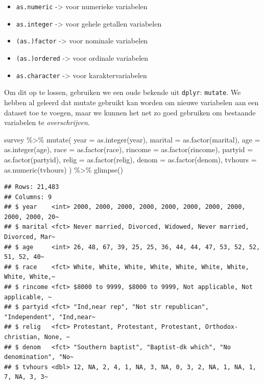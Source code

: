 \documentclass[]{tufte-book}
\newenvironment{Shaded}{}{}
\newcommand{\AttributeTok}[1]{\textcolor[rgb]{0.49,0.56,0.16}{#1}}
\newcommand{\FunctionTok}[1]{\textcolor[rgb]{0.02,0.16,0.49}{#1}}
\newcommand{\NormalTok}[1]{#1}
\newcommand{\SpecialCharTok}[1]{\textcolor[rgb]{0.25,0.44,0.63}{#1}}
\providecommand{\tightlist}{%
  \setlength{\itemsep}{0pt}\setlength{\parskip}{0pt}}
\begin{document}
\begin{itemize}
\tightlist
\item
  \texttt{as.numeric} -\textgreater{} voor numerieke variabelen
\item
  \texttt{as.integer} -\textgreater{} voor gehele getallen variabelen
\item
  \texttt{(as.)factor} -\textgreater{} voor nominale variabelen
\item
  \texttt{(as.)ordered} -\textgreater{} voor ordinale variabelen
\item
  \texttt{as.character} -\textgreater{} voor karaktervariabelen
\end{itemize}

Om dit op te lossen, gebruiken we een oude bekende uit \texttt{dplyr}: \texttt{mutate}. We hebben al geleerd dat mutate gebruikt kan worden om nieuwe variabelen aan een dataset toe te voegen, maar we kunnen het net zo goed gebruiken om bestaande variabelen te \emph{overschrijven}.

\begin{Shaded}
\begin{Highlighting}[]
\NormalTok{survey }\SpecialCharTok{\%\textgreater{}\%}
  \FunctionTok{mutate}\NormalTok{(}
    \AttributeTok{year =} \FunctionTok{as.integer}\NormalTok{(year),}
    \AttributeTok{marital =} \FunctionTok{as.factor}\NormalTok{(marital),}
    \AttributeTok{age =} \FunctionTok{as.integer}\NormalTok{(age),}
    \AttributeTok{race =} \FunctionTok{as.factor}\NormalTok{(race),}
    \AttributeTok{rincome =} \FunctionTok{as.factor}\NormalTok{(rincome),}
    \AttributeTok{partyid =} \FunctionTok{as.factor}\NormalTok{(partyid),}
    \AttributeTok{relig =} \FunctionTok{as.factor}\NormalTok{(relig),}
    \AttributeTok{denom =} \FunctionTok{as.factor}\NormalTok{(denom),}
    \AttributeTok{tvhours =} \FunctionTok{as.numeric}\NormalTok{(tvhours)}
\NormalTok{  ) }\SpecialCharTok{\%\textgreater{}\%}
  \FunctionTok{glimpse}\NormalTok{()}
\end{Highlighting}
\end{Shaded}

\begin{verbatim}
## Rows: 21,483
## Columns: 9
## $ year    <int> 2000, 2000, 2000, 2000, 2000, 2000, 2000, 2000, 2000, 2000, 20~
## $ marital <fct> Never married, Divorced, Widowed, Never married, Divorced, Mar~
## $ age     <int> 26, 48, 67, 39, 25, 25, 36, 44, 44, 47, 53, 52, 52, 51, 52, 40~
## $ race    <fct> White, White, White, White, White, White, White, White, White,~
## $ rincome <fct> $8000 to 9999, $8000 to 9999, Not applicable, Not applicable, ~
## $ partyid <fct> "Ind,near rep", "Not str republican", "Independent", "Ind,near~
## $ relig   <fct> Protestant, Protestant, Protestant, Orthodox-christian, None, ~
## $ denom   <fct> "Southern baptist", "Baptist-dk which", "No denomination", "No~
## $ tvhours <dbl> 12, NA, 2, 4, 1, NA, 3, NA, 0, 3, 2, NA, 1, NA, 1, 7, NA, 3, 3~
\end{verbatim}
\end{document}
